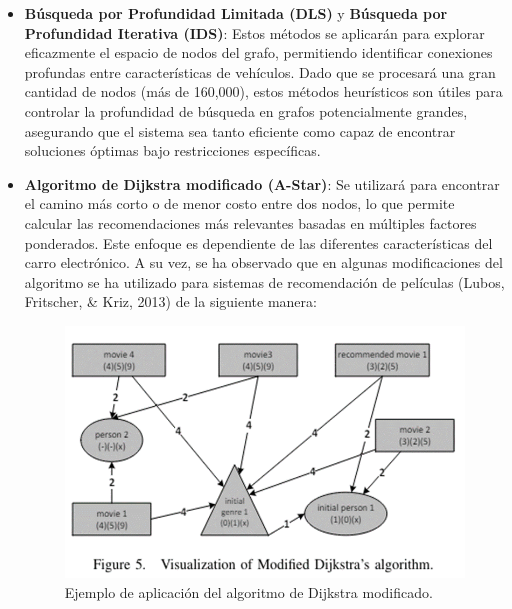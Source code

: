 \documentclass[12pt]{article}
\begin{document}
\begin{itemize}
    \item \textbf{Búsqueda por Profundidad Limitada (DLS)} y \textbf{Búsqueda por Profundidad Iterativa (IDS)}: Estos métodos se aplicarán para explorar eficazmente el espacio de nodos del grafo, permitiendo identificar conexiones profundas entre características de vehículos. Dado que se procesará una gran cantidad de nodos (más de 160,000), estos métodos heurísticos son útiles para controlar la profundidad de búsqueda en grafos potencialmente grandes, asegurando que el sistema sea tanto eficiente como capaz de encontrar soluciones óptimas bajo restricciones específicas.
    \item \textbf{Algoritmo de Dijkstra modificado (A-Star)}: Se utilizará para encontrar el camino más corto o de menor costo entre dos nodos, lo que permite calcular las recomendaciones más relevantes basadas en múltiples factores ponderados. Este enfoque es dependiente de las diferentes características del carro electrónico. A su vez, se ha observado que en algunas modificaciones del algoritmo se ha utilizado para sistemas de recomendación de películas (Lubos, Fritscher, \& Kriz, 2013) de la siguiente manera:
    
    \begin{figure}[htbp]
        \centering
        \includegraphics[width=\textwidth]{./imgs-latex/ejemplo-casos1-DijkstraModificado.png}
        \caption{Ejemplo de aplicación del algoritmo de Dijkstra modificado.}
        \label{fig:ejemplo-casos1-DijkstraModificado}
    \end{figure}
    
\end{itemize}
\end{document}
